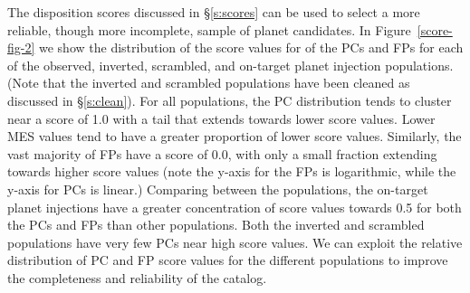 The disposition scores discussed in \S\ref{s:scores} can be used to select a more reliable, though more incomplete, sample of planet candidates. In Figure~\ref{score-fig-2} we show the distribution of the score values for of the PCs and FPs for each of the observed, inverted, scrambled, and on-target planet injection populations. (Note that the inverted and scrambled populations have been cleaned as discussed in \S\ref{s:clean}). For all populations, the PC distribution tends to cluster near a score of 1.0 with a tail that extends towards lower score values. Lower MES values tend to have a greater proportion of lower score values. Similarly, the vast majority of FPs have a score of 0.0, with only a small fraction extending towards higher score values (note the y-axis for the FPs is logarithmic, while the y-axis for PCs is linear.) Comparing between the populations, the on-target planet injections have a greater concentration of score values towards 0.5 for both the PCs and FPs than other populations. Both the inverted and scrambled populations have very few PCs near high score values. We can exploit the relative distribution of PC and FP score values for the different populations to improve the completeness and reliability of the catalog.

